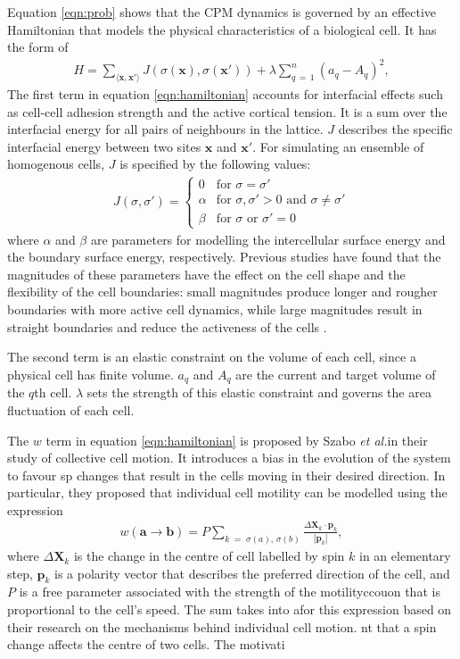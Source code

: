 \documentclass[a4paper,12pt]{article}
\newcommand{\abs}[1]{\left|#1\right|}
\newcommand{\inc}{\Delta}
\newcommand{\etal}{\textit{et al.}}
\begin{document}
Equation \ref{eqn:prob} shows that the CPM dynamics is governed by an effective Hamiltonian that models the physical characteristics of a biological cell. It has the form of 
\begin{eqnarray}
\label{eqn:hamiltonian}
H = \sum_{\langle{\bm{x}, \bm{x'}\rangle}} J\left(\sigma(\bm{x}), \sigma(\bm{x'})\right) + \lambda \sum_{q\,=\,1}^{n} \left(a_q - A_q\right)^2,
\end{eqnarray}
The first term in equation \ref{eqn:hamiltonian} accounts for interfacial effects such as cell-cell adhesion strength and the active cortical tension. It is a sum over the interfacial energy for all pairs of neighbours in the lattice. $J$ describes the specific interfacial energy between two sites $\bm{x}$ and $\bm{x'}$. For simulating an ensemble of homogenous cells, $J$ is specified by the following values:
\begin{eqnarray}
\label{eqn:interfacial_energy}
J(\sigma,\sigma') = \left\{
	\begin {array}{ll}
		0 & \textrm{for $\sigma = \sigma'$}\\
		\alpha & \textrm{for $\sigma, \sigma' > 0$ and $\sigma \neq \sigma'$}\\
		\beta & \textrm{for $\sigma$ or $\sigma' = 0$}
	\end{array}
\right.
\end{eqnarray}
where $\alpha$ and $\beta$ are parameters for modelling the intercellular surface energy and the boundary surface energy, respectively. Previous studies have found that the magnitudes of these parameters have the effect on the cell shape and the flexibility of the cell boundaries: small magnitudes produce longer and rougher boundaries with more active cell dynamics, while large magnitudes result in straight boundaries and reduce the activeness of the cells \cite{szabo2010}.

The second term is an elastic constraint on the volume of each cell, since a physical cell has finite volume. $a_q$ and $A_q$ are the current and target volume of the $q$th cell. $
\lambda$ sets the strength of this elastic constraint and governs the area fluctuation of each cell.

The $w$ term in equation \ref{eqn:hamiltonian} is proposed by Szabo \etal in their study of collective cell motion\cite{szabo201in0}. It introduces a bias in the evolution of the system to favour sp changes that result in the cells moving in their desired direction. In particular, they proposed that individual cell motility can be modelled using the expression 
\begin{eqnarray}
w (\bm{a} \rightarrow \bm{b}) = P \sum_{k \;=\; \sigma(a),\,\sigma(b)} \frac{\inc \bm{X}_k \cdot \bm{p}_k}{\abs{\bm{p}_k}},
\end{eqnarray}
where $\inc \bm{X}_k$ is the change in the centre of cell labelled by spin $k$ in an elementary step, $\bm{p}_k$ is a polarity vector that describes the preferred direction of the cell, and $P$ is a free parameter associated with the strength of the motilityccouon  that is proportional to the cell's speed. The sum takes into afor this expression based on their research on the mechanisms behind individual cell motion. nt that a spin change affects the centre of two cells. The motivati
\end{document}
